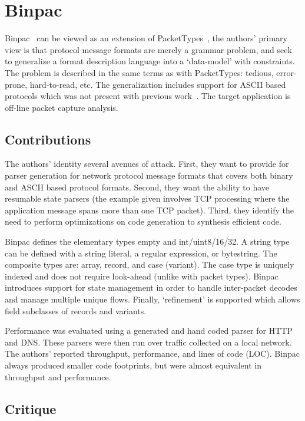 \section{Binpac}

Binpac~\cite{binpac} can be viewed as an extension of
PacketTypes~\cite{packet_types}, the authors' primary view is that
protocol message formats are merely a grammar problem, and seek
to generalize a format description language into a `data-model' with
constraints. The problem is described in the same terms as with PacketTypes:
tedious, error-prone, hard-to-read, etc. The generalization includes support for
ASCII based protocols which was not present with previous 
work~\cite{packet_types}. The target application is off-line packet capture
analysis.

\subsection{Contributions}

The authors' identity several avenues of attack. First, they want to provide for
parser generation for network protocol message formats that covers both binary
and ASCII based protocol formats. Second, they want the ability to have
resumable state parsers (the example given involves TCP processing where the
application message spans more than one TCP packet). Third, they identify the
need to perform optimizations on code generation to synthesis efficient code.

Binpac defines the elementary types empty and int/uint{8/16/32}. A string type
can be defined with a string literal, a regular expression, or bytestring. 
The composite types are: array, record, and case (variant). The case type is
uniquely indexed and does not require look-ahead (unlike with packet types).
Binpac introduces support for state management in order to handle inter-packet
decodes and manage multiple unique flows. Finally, `refinement' is supported
which allows field subclasses of records and variants.

Performance was evaluated using a generated and hand coded parser for HTTP and
DNS. These parsers were then run over traffic collected on a local network. The
authors' reported throughput, performance, and lines of code (LOC). Binpac always
produced smaller code footprints, but were almost equivalent in throughput and
performance.

\subsection{Critique}

